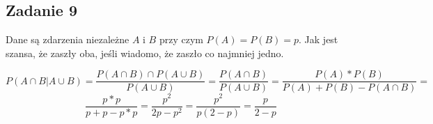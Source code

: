 \subsection{Zadanie 9}

Dane są zdarzenia niezależne $A$ i $B$ przy czym $P(A) = P(B) = p$. Jak jest szansa, że zaszły oba, jeśli wiadomo, że zaszło co najmniej jedno.

$$
P(A \cap B | A \cup B ) =  \frac {P(A \cap B ) \cap P ( A \cup B)} { P ( A \cup B)} = 
\frac {P(A \cap B )} { P ( A \cup B)} =  
\frac {P(A) * P (B)} {P(A) + P (B) - P ( A \cap B)} = 
$$
$$
\frac {p * p} {p + p - p * p} = \frac {p ^ {2} }{2p - p ^{2}} = 
\frac {p ^{2}} {p( 2 - p) } = 
\frac {p} { 2 - p } 
$$

